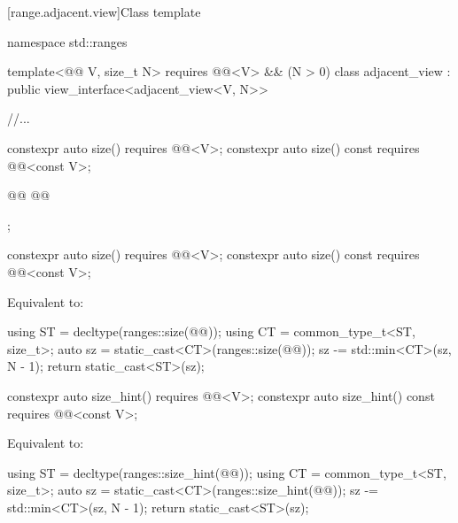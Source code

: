 \documentclass{wg21}
\begin{document}
[range.adjacent.view]{Class template }

%
%
%
\begin{codeblock}
namespace std::ranges {
template<@@ V, size_t N>
requires @@<V> && (N > 0)
class adjacent_view : public view_interface<adjacent_view<V, N>> {
    //...

    constexpr auto size() requires @@<V>;
    constexpr auto size() const requires @@<const V>;

    @@
    @@

};
}
\end{codeblock}

\begin{itemdecl}
    constexpr auto size() requires @@<V>;
    constexpr auto size() const requires @@<const V>;
\end{itemdecl}

\begin{itemdescr}
    \pnum
    \effects
    Equivalent to:
    \begin{codeblock}
        using ST = decltype(ranges::size(@@));
        using CT = common_type_t<ST, size_t>;
        auto sz = static_cast<CT>(ranges::size(@@));
        sz -= std::min<CT>(sz, N - 1);
        return static_cast<ST>(sz);
    \end{codeblock}
\end{itemdescr}

\begin{addedblock}
\begin{itemdecl}
    constexpr auto size_hint() requires @@<V>;
    constexpr auto size_hint() const requires @@<const V>;
\end{itemdecl}

\begin{itemdescr}
\pnum
\effects
Equivalent to:
\begin{codeblock}
    using ST = decltype(ranges::size_hint(@@));
    using CT = common_type_t<ST, size_t>;
    auto sz = static_cast<CT>(ranges::size_hint(@@));
    sz -= std::min<CT>(sz, N - 1);
    return static_cast<ST>(sz);
\end{codeblock}
\end{itemdescr}
\end{addedblock}
\end{document}
